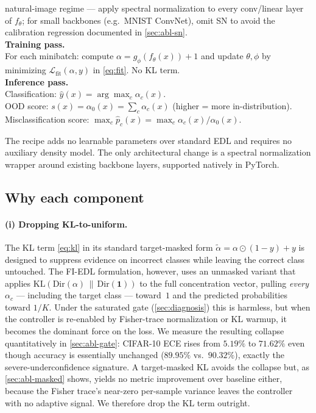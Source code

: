 \documentclass[review,5p,times]{elsarticle}
\begin{document}
\begin{algorithm}[t]
  \caption{Spectral-normalized, KL-free EDL (training and inference).}
  \label{alg:recipe}
  \small
   natural-image regime --- apply spectral
    normalization to every conv/linear layer of $f_\theta$; for small
    backbones (e.g.\ MNIST ConvNet), omit SN to avoid the calibration
    regression documented in \autoref{sec:abl-sn}.\\
  \textbf{Training pass.}\\
  \quad For each minibatch: compute $\alpha = g_\phi(f_\theta(x))+1$ and
       update $\theta,\phi$ by minimizing $\mathcal{L}_{\text{fit}}(\alpha,y)$
       in \eqref{eq:fit}. No KL term.\\[2pt]
  \textbf{Inference pass.}\\
  \quad Classification: $\hat y(x) = \arg\max_c \alpha_c(x)$.\\
  \quad OOD score: $s(x) = \alpha_0(x) = \sum_c \alpha_c(x)$
       (higher = more in-distribution).\\
  \quad Misclassification score: $\max_c \hat p_c(x) = \max_c \alpha_c(x)/\alpha_0(x)$.
\end{algorithm}

The recipe adds no learnable parameters over standard EDL and requires no
auxiliary density model. The only architectural change is a spectral
normalization wrapper around existing backbone layers, supported natively in
PyTorch.

\subsection{Why each component}\label{sec:why}

\paragraph{(i) Dropping KL-to-uniform.}
The KL term \eqref{eq:kl} in its standard target-masked form
$\tilde\alpha=\alpha\odot(1-y)+y$ is designed to suppress evidence on
incorrect classes while leaving the correct class untouched. The FI-EDL
formulation, however, uses an unmasked variant that applies
$\mathrm{KL}(\mathrm{Dir}(\alpha)\,\|\,\mathrm{Dir}(\mathbf{1}))$ to the full
concentration vector, pulling \emph{every} $\alpha_c$ — including the target
class — toward~$1$ and the predicted probabilities toward $1/K$. Under the
saturated gate (\autoref{sec:diagnosis}) this is harmless, but when the
controller is re-enabled by Fisher-trace normalization or KL warmup, it
becomes the dominant force on the loss. We measure the resulting collapse
quantitatively in \autoref{sec:abl-gate}: CIFAR-10 ECE rises from
$5.19\%$ to $71.62\%$ even though accuracy is essentially unchanged
($89.95\%$ vs.\ $90.32\%$), exactly the severe-underconfidence signature.
A target-masked KL avoids the collapse but, as \autoref{sec:abl-masked} shows,
yields no metric improvement over baseline either, because the Fisher trace's
near-zero per-sample variance leaves the controller with no adaptive signal.
We therefore drop the KL term outright.
\end{document}
